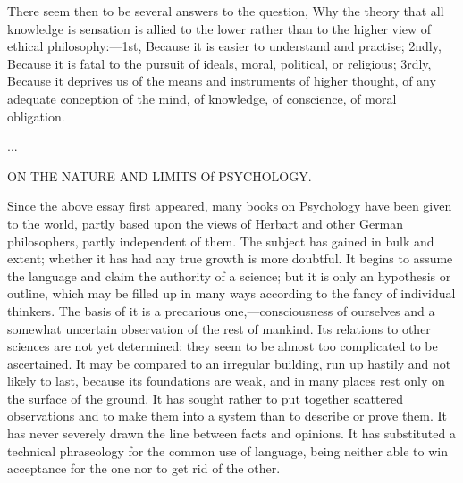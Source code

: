 \documentclass[11pt,letter]{article}
\begin{document}
\par  There seem then to be several answers to the question, Why the theory that all knowledge is sensation is allied to the lower rather than to the higher view of ethical philosophy:—1st, Because it is easier to understand and practise; 2ndly, Because it is fatal to the pursuit of ideals, moral, political, or religious; 3rdly, Because it deprives us of the means and instruments of higher thought, of any adequate conception of the mind, of knowledge, of conscience, of moral obligation.

\par  ...

\par  ON THE NATURE AND LIMITS Of PSYCHOLOGY.
 
\par  Since the above essay first appeared, many books on Psychology have been given to the world, partly based upon the views of Herbart and other German philosophers, partly independent of them. The subject has gained in bulk and extent; whether it has had any true growth is more doubtful. It begins to assume the language and claim the authority of a science; but it is only an hypothesis or outline, which may be filled up in many ways according to the fancy of individual thinkers. The basis of it is a precarious one,—consciousness of ourselves and a somewhat uncertain observation of the rest of mankind. Its relations to other sciences are not yet determined: they seem to be almost too complicated to be ascertained. It may be compared to an irregular building, run up hastily and not likely to last, because its foundations are weak, and in many places rest only on the surface of the ground. It has sought rather to put together scattered observations and to make them into a system than to describe or prove them. It has never severely drawn the line between facts and opinions. It has substituted a technical phraseology for the common use of language, being neither able to win acceptance for the one nor to get rid of the other.
\end{document}

